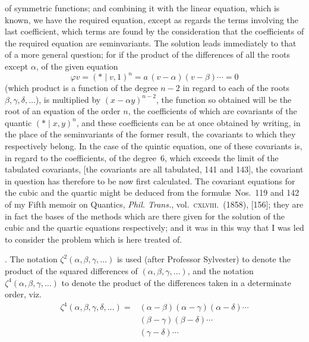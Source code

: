 \documentclass[11pt]{article}
\newcommand{\Cdel}{\mid}
\begin{document}
\noindent of symmetric functions; and combining it with the linear equation, which is known, we have the required equation, except as regards the terms involving the last coefficient, which terms are found by the consideration that the coefficients of the required equation are seminvariants. The solution leads immediately to that of a more general question; for if the product of the differences of all the roots except $\alpha$, of the given equation
\[
   \varphi v = (\ast \Cdel v, 1)^n = a\,(v - \alpha)(v - \beta)\cdots = 0
\]
(which product is a function of the degree $n - 2$ in regard to each of the roots $\beta, \gamma, \delta, \ldots$), is multiplied by $(x - \alpha y)^{n-2}$, the function so obtained will be the root of an equation of the order $n$, the coefficients of which are covariants of the quantic $(\ast \Cdel x, y)^n$, and these coefficients can be at once obtained by writing, in the place of the seminvariants of the former result, the covariants to which they respectively belong. In the case of the quintic equation, one of these covariants is, in regard to the coefficients, of the degree~6, which exceeds the limit of the tabulated covariants, [the covariants are all tabulated, 141 and 143], the covariant in question has therefore to be now first calculated. The covariant equations for the cubic and the quartic might be deduced from the formul\ae\ Nos.~119 and 142 of my Fifth memoir on Quantics, \textit{Phil. Trans.}, vol.~\textsc{cxlviii.}\ (1858), [156]; they are in fact the bases of the methods which are there given for the solution of the cubic and the quartic equations respectively; and it was in this way that I was led to consider the problem which is here treated of.

\medskip

. The notation $\zeta^2(\alpha, \beta, \gamma, \ldots)$ is used (after Professor Sylvester) to denote the product of the squared differences of $(\alpha, \beta, \gamma, \ldots)$, and the notation $\zeta^4(\alpha, \beta, \gamma, \ldots)$ to denote the product of the differences taken in a determinate order, viz.
\[
\begin{aligned}
   \zeta^4(\alpha, \beta, \gamma, \delta, \ldots) ={}& (\alpha - \beta)(\alpha - \gamma)(\alpha - \delta)\cdots\\
                                                  & (\beta - \gamma)(\beta - \delta)\cdots\\
                                                  & (\gamma - \delta)\cdots
\end{aligned}
\]
\end{document}
